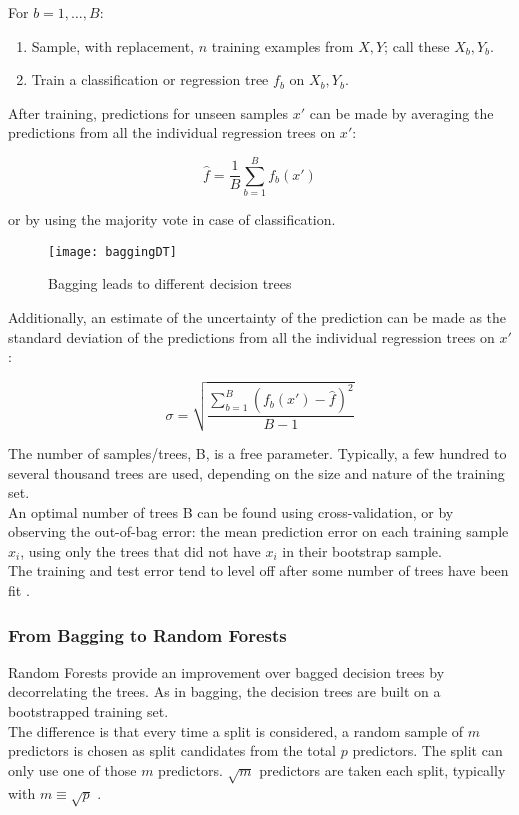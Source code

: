 For $b = 1, \dots, B$:
\begin{enumerate}[noitemsep]
	\item Sample, with replacement, $n$ training examples from $X, Y$; call these $X_b, Y_b$.
	\item Train a classification or regression tree $f_b$ on $X_b, Y_b$.
\end{enumerate}

After training, predictions for unseen samples $x'$ can be made by averaging the predictions from all the individual regression trees on $x'$:

\begin{equation}
	{{\hat {f}}={\frac {1}{B}}\sum _{b=1}^{B}f_{b}(x')}
\end{equation}

or by using the majority vote in case of classification.

\begin{figure}[H]
	\centering
	\texttt{[image: baggingDT]}
	\caption{Bagging leads to different decision trees \cite{baggingDT}}
	\label{fig:baggingDT}
\end{figure}

Additionally, an estimate of the uncertainty of the prediction can be made as the standard deviation of the predictions from all the individual regression trees on $x'$:

\begin{equation}
	{\sigma ={\sqrt {\frac {\sum_{b=1}^{B}(f_{b}(x')-{\hat {f}})^{2}}{B-1}}}}
\end{equation}

The number of samples/trees, B, is a free parameter. Typically, a few hundred to several thousand trees are used, depending on the size and nature of the training set. \\
An optimal number of trees B can be found using cross-validation, or by observing the out-of-bag error: the mean prediction error on each training sample $x_i$, using only the trees that did not have $x_i$ in their bootstrap sample. \\
The training and test error tend to level off after some number of trees have been fit \cite{ISLR}.

\subsubsection{From Bagging to Random Forests}
Random Forests provide an improvement over bagged decision trees by decorrelating the trees. As in bagging, the decision trees are built on a bootstrapped training set. \\
The difference is that every time a split is considered, a random sample of $m$ predictors is chosen as split candidates from the total $p$ predictors. The split can only use one of those $m$ predictors. $\sqrt{m}$ predictors are taken each split, typically with $m \equiv \sqrt{p}$ \cite{ISLR}.

